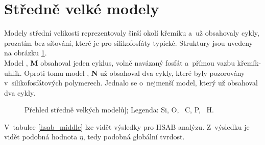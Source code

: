 \documentclass[
digital, %
table,   %
lof,     %
lot,     %
oneside,
]{fithesis3}
\renewcommand{\thesubfigure}{}
\begin{document}
\section{Středně velké modely}
Modely střední velikosti reprezentovaly širší okolí křemíku a~už obsahovaly cykly, prozatím bez síťování, které je pro silikofosfáty typické. Struktury jsou uvedeny na obrázku \ref{prehled_middle}. \\
Model , \textbf{M} obsahoval jeden cyklus, volně navázaný fosfát a~přímou vazbu křemík-uhlík. Oproti tomu model , \textbf{N} už obsahoval dva cykly, které byly pozorovány v~silikofosfátových polymerech. Jednalo se o~nejmenší model, který už obsahoval dva cykly.\\
\renewcommand{\thesubfigure}{}
\begin{figure}
\begin{center}
\caption{Přehled středně velkých modelů];  Legenda:  Si,  O, ~C,  P, ~H.}
\label{prehled_middle}
\end{center}
\end{figure}
V~tabulce \ref{hsab_middle} lze vidět výsledky pro HSAB analýzu. Z~výsledku je vidět podobná hodnota $\eta$, tedy podobná globální tvrdost.
\end{document}
